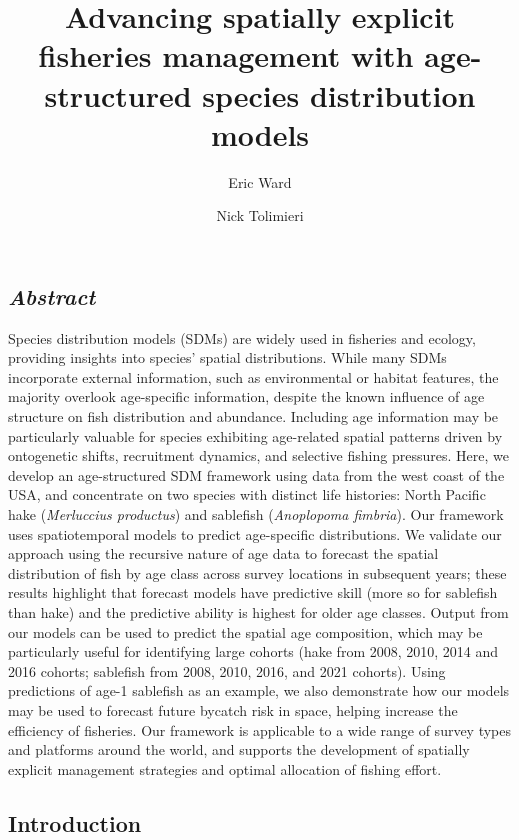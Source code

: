 \documentclass[
]{article}
\title{Advancing spatially explicit fisheries management with
age-structured species distribution models}
\author{Eric Ward}
\author{Nick Tolimieri}
\affil{%
          Conservation Biology Division, Northwest Fisheries Science
          Center, National Marine Fisheries Service, National
          Oceanographic and Atmospheric Administration, 2725 Montlake
          Blvd E, Seattle WA 98112
        }
\date{}
\begin{document}
\maketitle

\subsection{\texorpdfstring{\emph{Abstract}}{Abstract}}\label{abstract}

Species distribution models (SDMs) are widely used in fisheries and
ecology, providing insights into species' spatial distributions. While
many SDMs incorporate external information, such as environmental or
habitat features, the majority overlook age-specific information,
despite the known influence of age structure on fish distribution and
abundance. Including age information may be particularly valuable for
species exhibiting age-related spatial patterns driven by ontogenetic
shifts, recruitment dynamics, and selective fishing pressures. Here, we
develop an age-structured SDM framework using data from the west coast
of the USA, and concentrate on two species with distinct life histories:
North Pacific hake (\emph{Merluccius productus}) and sablefish
(\emph{Anoplopoma fimbria}). Our framework uses spatiotemporal models to
predict age-specific distributions. We validate our approach using the
recursive nature of age data to forecast the spatial distribution of
fish by age class across survey locations in subsequent years; these
results highlight that forecast models have predictive skill (more so
for sablefish than hake) and the predictive ability is highest for older
age classes. Output from our models can be used to predict the spatial
age composition, which may be particularly useful for identifying large
cohorts (hake from 2008, 2010, 2014 and 2016 cohorts; sablefish from
2008, 2010, 2016, and 2021 cohorts). Using predictions of age-1
sablefish as an example, we also demonstrate how our models may be used
to forecast future bycatch risk in space, helping increase the
efficiency of fisheries. Our framework is applicable to a wide range of
survey types and platforms around the world, and supports the
development of spatially explicit management strategies and optimal
allocation of fishing effort.

\subsection{Introduction}\label{introduction}
\end{document}
